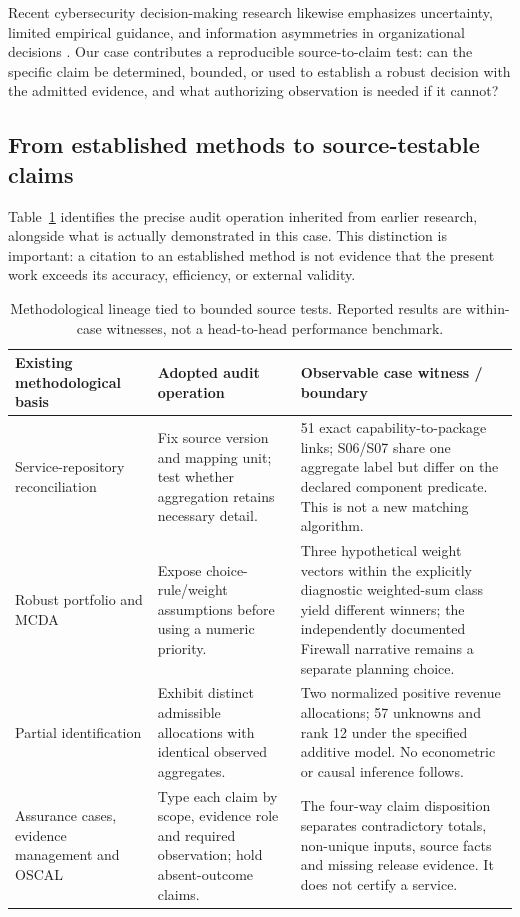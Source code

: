 \documentclass[systems,article,submit,moreauthors]{Definitions/mdpi}
\begin{document}
Recent cybersecurity decision-making research likewise emphasizes uncertainty, limited empirical guidance, and information asymmetries in organizational decisions \cite{Dawson2026}. Our case contributes a reproducible source-to-claim test: can the specific claim be determined, bounded, or used to establish a robust decision with the admitted evidence, and what authorizing observation is needed if it cannot?

\subsection{From established methods to source-testable claims}
Table~\ref{tab:lineage} identifies the precise audit operation inherited from earlier research, alongside what is actually demonstrated in this case. This distinction is important: a citation to an established method is not evidence that the present work exceeds its accuracy, efficiency, or external validity.

\begin{table}[H]
\centering\footnotesize
\caption{Methodological lineage tied to bounded source tests. Reported results are within-case witnesses, not a head-to-head performance benchmark.}
\label{tab:lineage}
\begin{tabularx}{\linewidth}{>{\raggedright\arraybackslash}p{2.65cm} >{\raggedright\arraybackslash}p{2.70cm} X}
\toprule
Existing methodological basis & Adopted audit operation & Observable case witness / boundary \\
\midrule
Service-repository reconciliation \cite{Comerio2015,BatiniComerio2016} & Fix source version and mapping unit; test whether aggregation retains necessary detail. & 51 exact capability-to-package links; S06/S07 share one aggregate label but differ on the declared component predicate. This is not a new matching algorithm. \\
Robust portfolio and MCDA \cite{Liesio2008,Tavana2019} & Expose choice-rule/weight assumptions before using a numeric priority. & Three hypothetical weight vectors within the explicitly diagnostic weighted-sum class yield different winners; the independently documented Firewall narrative remains a separate planning choice. \\
Partial identification \cite{Manski2005} & Exhibit distinct admissible allocations with identical observed aggregates. & Two normalized positive revenue allocations; 57 unknowns and rank 12 under the specified additive model. No econometric or causal inference follows. \\
Assurance cases, evidence management and OSCAL \cite{Mohamad2021,MohamadEvidence2024,OSCALAR2026} & Type each claim by scope, evidence role and required observation; hold absent-outcome claims. & The four-way claim disposition separates contradictory totals, non-unique inputs, source facts and missing release evidence. It does not certify a service. \\
\bottomrule
\end{tabularx}
\end{table}
\end{document}
